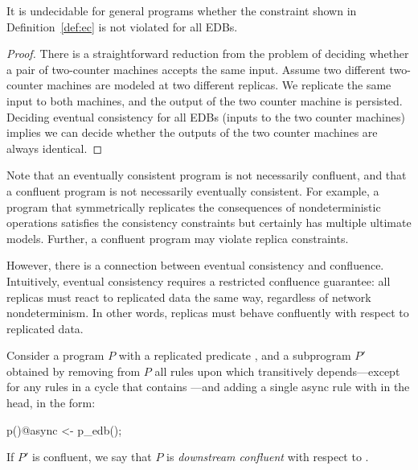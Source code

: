 \begin{lemma}
It is undecidable for general \lang programs whether the constraint shown in Definition~\ref{def:ec} is not violated for all EDBs.
\end{lemma}
\begin{proof}
There is a straightforward reduction from the problem of deciding whether a pair of two-counter machines accepts the same input.  Assume two different two-counter machines are modeled at two different replicas.  We replicate the same input to both machines, and the output of the two counter machine is persisted.  Deciding eventual consistency for all EDBs (inputs to the two counter machines) implies we can decide whether the outputs of the two counter machines are always identical.
\end{proof}



Note that an eventually consistent program is not necessarily confluent, and that
a confluent program is not necessarily eventually consistent.  For example, a program
that symmetrically replicates the consequences of nondeterministic operations satisfies
the consistency constraints but certainly has multiple ultimate models.  Further, a confluent
program may violate replica constraints.

However, there is a connection between eventual consistency and confluence.  Intuitively, eventual consistency requires a restricted confluence guarantee: all replicas must react to replicated data the same way, regardless of network nondeterminism.  In other words, replicas must behave confluently with respect to replicated data.

\begin{definition}
Consider a \lang program $P$ with a replicated predicate , and a subprogram
$P'$ obtained by removing from $P$ all rules upon which  transitively
depends---except for any rules in a cycle that contains ---and adding a single async rule with  in the head, in the form:

\begin{Dedalus}
p()@async <- p_edb();
\end{Dedalus}
If $P'$ is confluent, we say that $P$ is {\em downstream confluent} with respect to .  
\end{definition}

